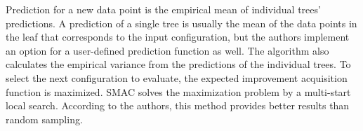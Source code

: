 Prediction for a new data point is the empirical mean of individual trees' predictions. A prediction of a single tree is usually the mean of the data points in the leaf that corresponds to the input configuration, but the authors implement an option for a user-defined prediction function as well. The algorithm also calculates the empirical variance from the predictions of the individual trees. To select the next configuration to evaluate, the expected improvement acquisition function is maximized. SMAC solves the maximization problem by a multi-start local search. According to the authors, this method provides better results than random sampling.
